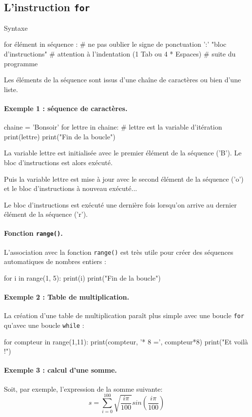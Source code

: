 \documentclass[%
oneside,                 %
final,                   %
10pt]{article}
\begin{document}
\subsection{L'instruction \texttt{for} }

\begin{block}{Syntaxe }

\bpycod
for élément in séquence :     # ne pas oublier le signe de ponctuation ':'
    "bloc d'instructions"     # attention à l'indentation (1 Tab ou 4 * Espaces)
# suite du programme
\epycod
\end{block}

Les éléments de la séquence sont issus d'une chaîne de caractères ou bien d'une liste.
\paragraph{Exemple 1 : séquence de caractères.}
\bpycod
chaine = 'Bonsoir'
for lettre in chaine:  # lettre est la variable d'itération
    print(lettre)
print("Fin de la boucle")
\epycod

La variable lettre est initialisée avec le premier élément de la séquence ('B').
Le bloc d'instructions est alors exécuté.

Puis la variable lettre est mise à jour avec le second élément de la séquence ('o') et le bloc d'instructions à nouveau exécuté...

Le bloc d'instructions est exécuté une dernière fois lorsqu'on arrive au dernier élément de la séquence ('r').
\paragraph{Fonction \texttt{range()}.}
L'association avec la fonction \texttt{range()} est très utile pour créer des séquences automatiques de nombres entiers :

\bpycod
for i in range(1, 5):
    print(i)
print("Fin de la boucle")
\epycod
\paragraph{Exemple 2 : Table de multiplication.}
La création d'une table de multiplication paraît plus simple avec une boucle \texttt{for} qu'avec une boucle \texttt{while} :

\bpycod
for compteur in range(1,11):
    print(compteur, '* 8 =', compteur*8)
print("Et voilà !")
\epycod
\paragraph{Exemple 3 : calcul d'une somme.}
Soit, par exemple, l'expression de la somme suivante:
\[
s = \sum_{i = 0}^{100} \sqrt{\frac{i \pi}{100}} sin(\frac{i \pi}{100})
\]
\end{document}
